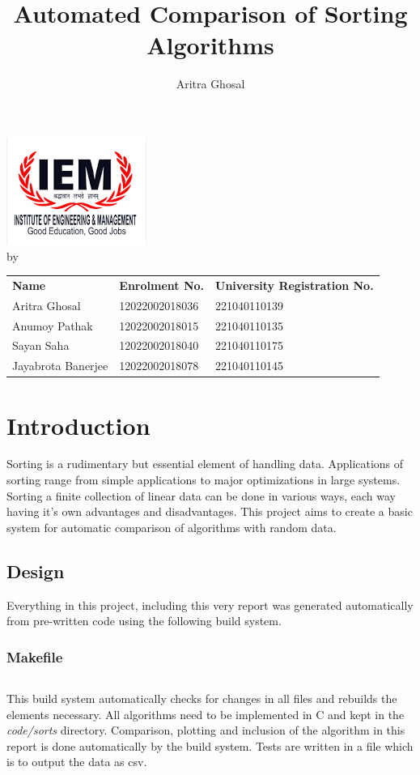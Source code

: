 \documentclass{article}
\title{Automated Comparison of Sorting Algorithms}
\author{Aritra Ghosal}
\date{}
\begin{document}
\maketitle
\begin{center}
\includegraphics[scale=0.5]{instructions/IEM logo.png}
\\by\\
	\vspace{2em}
	\begin{tabular}{lll}
		\textbf{Name}&\textbf{Enrolment No.}&\textbf{University Registration No.}\\
		Aritra Ghosal&12022002018036&221040110139\\
		Anumoy Pathak&12022002018015&221040110135\\
		Sayan Saha&12022002018040&221040110175\\
		Jayabrota Banerjee&12022002018078&221040110145
	\end{tabular}
\newpage
\end{center}
\section*{Introduction}
Sorting is a rudimentary but essential element of handling data. Applications of sorting range from simple applications to major optimizations in large systems.
Sorting a finite collection of linear data can be done in various ways, each way having it's own advantages and disadvantages.
This project aims to create a basic system for automatic comparison of algorithms with random data.
\subsection*{Design}
Everything in this project, including this very report was generated automatically from pre-written code using the following build system.\\
\subsubsection*{Makefile}
\inputminted{make}{Makefile}
This build system automatically checks for changes in all files and rebuilds the elements necessary.
All algorithms need to be implemented in C and kept in the \emph{code/sorts} directory.
Comparison, plotting and inclusion of the algorithm in this report is done automatically by the build system.
Tests are written in a file which is to output the data as csv.
\end{document}
